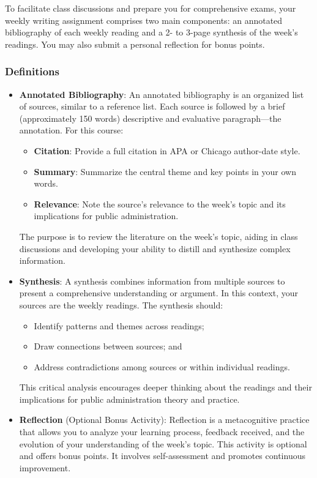 \documentclass[12pt, letterpaper]{article}
\begin{document}
To facilitate class discussions and prepare you for comprehensive exams, your weekly writing assignment comprises two main components: an annotated bibliography of each weekly reading and a 2- to 3-page synthesis of the week's readings. You may also submit a personal reflection for bonus points. 

\subsubsection*{Definitions}
\begin{itemize}
\item \textbf{Annotated Bibliography}: An annotated bibliography is an organized list of sources, similar to a reference list. Each source is followed by a brief (approximately 150 words) descriptive and evaluative paragraph—the annotation. For this course:

\begin{itemize}
    \item \textbf{Citation}: Provide a full citation in APA or Chicago author-date style.
    \item \textbf{Summary}: Summarize the central theme and key points in your own words.
    \item \textbf{Relevance}: Note the source's relevance to the week's topic and its implications for public administration.
\end{itemize}

\noindent The purpose is to review the literature on the week's topic, aiding in class discussions and developing your ability to distill and synthesize complex information.

\item \textbf{Synthesis}: A synthesis combines information from multiple sources to present a comprehensive understanding or argument. In this context, your sources are the weekly readings. The synthesis should:

\begin{itemize}
    \item Identify patterns and themes across readings;
    \item Draw connections between sources; and
    \item Address contradictions among sources or within individual readings.
\end{itemize}

\noindent This critical analysis encourages deeper thinking about the readings and their implications for public administration theory and practice.

\item \textbf{Reflection} (Optional Bonus Activity): Reflection is a metacognitive practice that allows you to analyze your learning process, feedback received, and the evolution of your understanding of the week's topic. This activity is optional and offers bonus points. It involves self-assessment and promotes continuous improvement.

\end{itemize}
\end{document}

